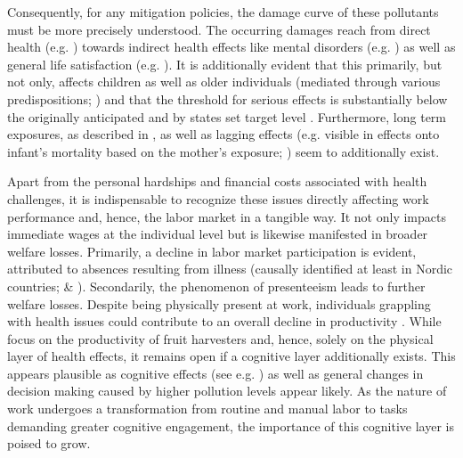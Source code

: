 \documentclass[12pt,a4paper]{article}
\begin{document}
Consequently, for any mitigation policies, the damage curve of these pollutants must be more precisely understood. The occurring damages reach from direct health (e.g. \citealp{schlenker2016,kampa2008,chen2021}) towards indirect health effects like mental disorders (e.g. \citealp{pedersen2004,szyszkowicz2007,zhang2017}) as well as general life satisfaction (e.g. \citealp{mackerron2009,rehdanz2008,szyszkowicz2007}).  It is additionally evident that this primarily, but not only, affects children \citep{beatty2014} as well as older individuals (mediated through various predispositions; \citealp{peled2011}) and that the threshold for serious effects is substantially below the originally anticipated and by states set target level \citep{beelen2014}. Furthermore, long term exposures, as described in \citet{beelen2014}, as well as lagging effects (e.g. visible in effects onto infant's mortality based on the mother's exposure; \citealp{chay2003}) seem to additionally exist.

Apart from the personal hardships and financial costs associated with health challenges, it is indispensable to recognize these issues directly affecting work performance and, hence, the labor market in a tangible way. It not only impacts immediate wages at the individual level but is likewise manifested in broader welfare losses. Primarily, a decline in labor market participation is evident, attributed to absences resulting from illness (causally identified at least in Nordic countries; \citealp{hansen2000} \& \citealp{jans2018}). Secondarily, the phenomenon of presenteeism leads to further welfare losses. Despite being physically present at work, individuals grappling with health issues could contribute to an overall decline in productivity \citep{zivin2012}. While \citet{zivin2012} focus on the productivity of fruit harvesters and, hence, solely on the physical layer of health effects, it remains open if a cognitive layer additionally exists. This appears plausible as cognitive effects (see e.g. \citealp{schikowski2015,tonne2014,ranft2009}) as well as general changes in decision making \citep{archsmith2018} caused by higher pollution levels appear likely. As the nature of work undergoes a transformation from routine and manual labor to tasks demanding greater cognitive engagement, the importance of this cognitive layer
is poised to grow.
\end{document}

